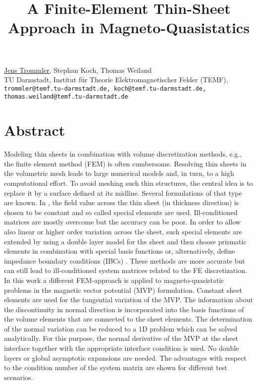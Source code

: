 \title{A Finite-Element Thin-Sheet Approach in Magneto-Quasistatics}
\author{} \institute{}
\maketitle

\begin{center}
{\large \underline{Jens Trommler}, Stephan Koch, Thomas Weiland}\\
TU Darmstadt, Institut f\"ur Theorie Elektromagnetischer Felder (TEMF),\\
{\tt trommler@temf.tu-darmstadt.de, koch@temf.tu-darmstadt.de, thomas.weiland@temf.tu-darmstadt.de}
\end{center}

\section*{Abstract}
Modeling thin sheets in combination with volume discretization methods, e.g., the finite element method (FEM) is often cumbersome. Resolving thin sheets in the volumetric mesh leads to large numerical models and, in turn, to a high computational effort.
To avoid meshing such thin structures, the central idea is to replace it by a surface defined at its midline. Several formulations of that type are known. In \cite{nakata}, the field value across the thin sheet (in thickness direction) is chosen to be constant and so called special elements are used. Ill-conditioned matrices are mostly overcome but the accuracy can be poor. In order to allow also linear or higher order variation across the sheet, such special elements are extended by using a double layer model for the sheet and then choose prismatic elements in combination with special basis functions \cite{ren,gyselinck} or, alternatively, define impedance boundary conditions (IBCs) \cite{krahenbuhl,mayergoyz}. These  methods are more accurate but can still lead to ill-conditioned system matrices related to the FE discretization.\\
In this work a different FEM-approach is applied to magneto-quasistatic problems in the magnetic vector potential (MVP) formulation. Constant sheet elements are used for the tangential variation of the MVP. The information about the discontinuity in normal direction is incorporated into the basis functions of the volume elements that are connected to the sheet elements. The determination of the normal variation can be reduced to a 1D problem which can be solved analytically. For this purpose, the normal derivative of the MVP at the sheet interface together with the appropriate interface condition is used. No double layers or global asymptotic expansions \cite{schmidt} are needed. The advantages with respect to the condition number of the system matrix are shown for different test scenarios.

